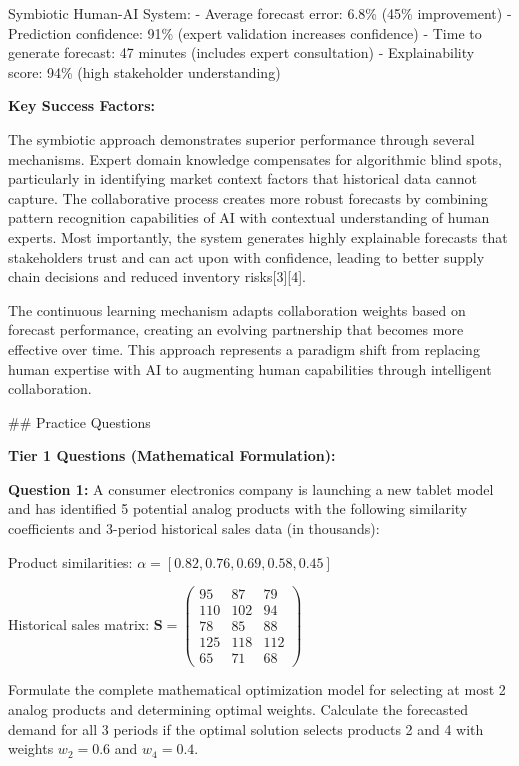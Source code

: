 \documentclass{article}
\begin{document}
Symbiotic Human-AI System:
- Average forecast error: 6.8\% (45\% improvement)
- Prediction confidence: 91\% (expert validation increases confidence)
- Time to generate forecast: 47 minutes (includes expert consultation)
- Explainability score: 94\% (high stakeholder understanding)

\textbf{Key Success Factors:}

The symbiotic approach demonstrates superior performance through several mechanisms. Expert domain knowledge compensates for algorithmic blind spots, particularly in identifying market context factors that historical data cannot capture. The collaborative process creates more robust forecasts by combining pattern recognition capabilities of AI with contextual understanding of human experts. Most importantly, the system generates highly explainable forecasts that stakeholders trust and can act upon with confidence, leading to better supply chain decisions and reduced inventory risks[3][4].

The continuous learning mechanism adapts collaboration weights based on forecast performance, creating an evolving partnership that becomes more effective over time. This approach represents a paradigm shift from replacing human expertise with AI to augmenting human capabilities through intelligent collaboration.

## Practice Questions

\textbf{Tier 1 Questions (Mathematical Formulation):}

\textbf{Question 1:} A consumer electronics company is launching a new tablet model and has identified 5 potential analog products with the following similarity coefficients and 3-period historical sales data (in thousands):

Product similarities: $\alpha = [0.82, 0.76, 0.69, 0.58, 0.45]$

Historical sales matrix:
$\mathbf{S} = \begin{pmatrix} 95 & 87 & 79 \\ 110 & 102 & 94 \\ 78 & 85 & 88 \\ 125 & 118 & 112 \\ 65 & 71 & 68 \end{pmatrix}$

Formulate the complete mathematical optimization model for selecting at most 2 analog products and determining optimal weights. Calculate the forecasted demand for all 3 periods if the optimal solution selects products 2 and 4 with weights $w_2 = 0.6$ and $w_4 = 0.4$.
\end{document}
